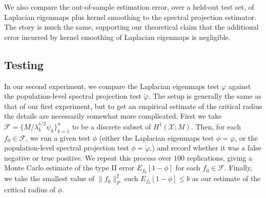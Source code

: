 \documentclass[aos]{imsart}
\theoremstyle{plain}
\theoremstyle{definition}
\theoremstyle{remark}
\newcommand{\wt}[1]{\widetilde{#1}}
\newcommand{\mc}[1]{\mathcal{#1}}
\newcommand{\1}{\mathbf{1}}
\begin{document}
We also compare the out-of-sample estimation error, over a held-out test set, of Laplacian eigenmaps plus kernel smoothing to the spectral projection estimator. The story is much the same, supporting our theoretical claim that the additional error incurred by kernel smoothing of Laplacian eigenmaps is negligible.

\subsection{Testing} 
In our second experiment, we compare the Laplacian eigenmaps test $\varphi$ against the  population-level spectral projection test $\wt{\varphi}$. The setup is generally the same as that of our first experiment, but to get an empirical estimate of the critical radius the details are necessarily somewhat more complicated. First we take $\mc{F} = \{M/\lambda_k^{s/2} \psi_k\}_{k = 1}^{n}$ to be a discrete subset of $H^1(\mc{X};M)$. Then, for each $f_0 \in \mc{F}$, we run a given test $\phi$ (either the Laplacian eigenmaps test $\phi = \varphi$, or the population-level spectral projection test $\phi = \wt{\varphi}$.) and record whether it was a false negative or true positive. We repeat this process over $100$ replications, giving a Monte Carlo estimate of the type II error $E_{f_0}[1 - \phi]$ for each $f_0 \in \mc{F}$. Finally, we take the smallest value of $\|f_0\|_P^2$ such $E_{f_0}[1 - \phi] \leq b$ as our estimate of the critical radius of $\phi$. 
\end{document}
